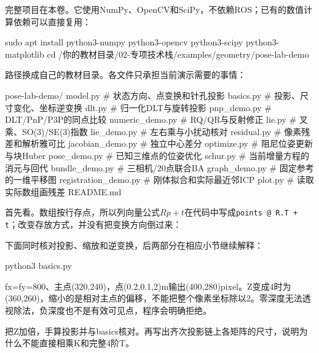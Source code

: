 \begin{example}[先搭一个可以逐项核对的项目]
完整项目在本卷。它使用NumPy、OpenCV和SciPy，不依赖ROS；已有的数值计算依赖可以直接复用：
\begin{tbash}
sudo apt install python3-numpy python3-opencv python3-scipy python3-matplotlib
cd /你的教材目录/02-专项技术栈/examples/geometry/pose-lab-demo
\end{tbash}
路径换成自己的教材目录。各文件只承担当前演示需要的事情：
\par\noindent\begin{minipage}{\linewidth}
\begin{tbash}
pose-lab-demo/
  model.py           # 状态方向、点变换和针孔投影
  basics.py          # 投影、尺寸变化、坐标逆变换
  dlt.py             # 归一化DLT与旋转投影
  pnp_demo.py        # DLT/PnP/P3P的同点比较
  numeric_demo.py    # RQ/QR与反射修正
  lie.py             # 叉乘、SO(3)/SE(3)指数
  lie_demo.py        # 左右乘与小扰动核对
  residual.py        # 像素残差和解析雅可比
  jacobian_demo.py   # 独立中心差分
  optimize.py        # 阻尼位姿更新与块Huber
  pose_demo.py       # 已知三维点的位姿优化
  schur.py           # 当前增量方程的消元与回代
  bundle_demo.py     # 三相机/20点联合BA
  graph_demo.py      # 固定参考的一维平移图
  registration_demo.py # 刚体拟合和实际最近邻ICP
  plot.py            # 读取实际数组画残差
  README.md
\end{tbash}
\end{minipage}\par
首先看。数组按行存点，所以列向量公式$Rp+t$在代码中写成\texttt{points @ R.T + t}；改变存放方式，并没有把变换方向倒过来：

下面同时核对投影、缩放和逆变换，后两部分在相应小节继续解释：

\begin{tbash}
python3 basics.py
\end{tbash}
fx=fy=800、主点(320,240)，点(0.2,0.1,2)m输出(400,280)pixel。Z变成4时为(360,260)，缩小的是相对主点的偏移，不能把整个像素坐标除以2。零深度无法透视除法，负深度也不是有效可见点，程序会明确拒绝。
\end{example}
\begin{exercise}\label{ex:v2-ba-projection}
把Z加倍，手算投影并与basics核对。再写出齐次投影链上各矩阵的尺寸，说明为什么不能直接相乘K和完整4阶T。
\end{exercise}

